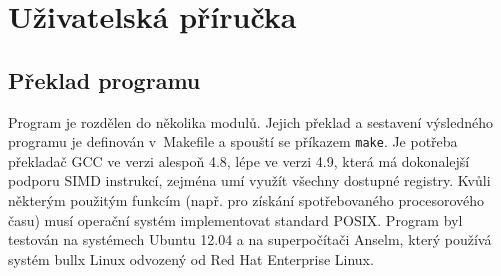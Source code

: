 

\newcommand\cmdarglist[1]{
    \begin{description}#1\end{description}
}

\newcommand\cmdarg[2]{
    \item[\texttt{#1}] \hfill \\
    #2
}

\newcommand\cmdargdef[3]{
    \item[\texttt{#1}] (výchozí: #2) \hfill \\
    #3
}

\newcommand\filelist[1]{
    \begin{description}#1\end{description}
}

\newcommand\file[2]{
    \item[\texttt{#1}] \hfill \\
    #2
}

\chapter{Uživatelská příručka}
\label{apxManual}

\section{Překlad programu}

Program je rozdělen do několika modulů. Jejich překlad a sestavení výsledného programu je definován v~Makefile a spouští se příkazem \texttt{make}. Je potřeba překladač GCC ve verzi alespoň 4.8, lépe ve verzi 4.9, která má dokonalejší podporu SIMD instrukcí, zejména umí využít všechny dostupné registry. Kvůli některým použitým funkcím (např. pro získání spotřebovaného procesorového času) musí operační systém implementovat standard POSIX. Program byl testován na systémech Ubuntu 12.04 a na superpočítači Anselm, který používá systém bullx Linux odvozený od Red Hat Enterprise Linux.

